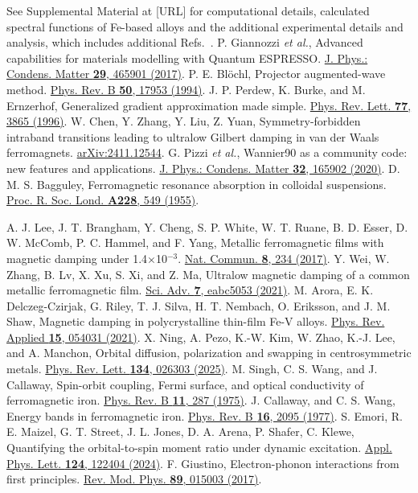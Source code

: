 \documentclass[prl,aps,twocolumn,showpacs,citeautoscript,reprint,superscriptaddress]{revtex4-1}
\newcommand{\DOI}[1]{\href{https://doi.org/#1}}
\begin{document}
\begin{thebibliography}{00}
See Supplemental Material at [URL] for computational details, calculated spectral functions of Fe-based alloys and the additional experimental details and analysis, which includes additional Refs.~\cite{Giannozzi:jpcm17,Blochl:prb94,Perdew:prl96,Chen:arxiv24,Pizzi:jpcm20,Bagguley:prsla55}.
P. Giannozzi {\it et al.}, Advanced capabilities for materials modelling with Quantum ESPRESSO. \DOI{10.1088/1361-648X/aa8f79}{J. Phys.: Condens. Matter {\bf 29}, 465901 (2017)}.
P. E. Bl{\"o}chl, Projector augmented-wave method. \DOI{10.1103/PhysRevB.50.17953}{Phys. Rev. B {\bf 50}, 17953 (1994)}.
J. P. Perdew, K. Burke, and M. Ernzerhof, Generalized gradient approximation made simple. \DOI{10.1103/PhysRevLett.77.3865}{Phys. Rev. Lett. {\bf 77}, 3865 (1996)}.
W. Chen, Y. Zhang, Y. Liu, Z. Yuan, Symmetry-forbidden intraband transitions leading to ultralow Gilbert damping in van der Waals ferromagnets. \href{https://arxiv.org/abs/2411.12544}{arXiv:2411.12544}.
G. Pizzi {\it et al.}, Wannier90 as a community code: new features and applications. \DOI{10.1088/1361-648X/ab51ff}{J. Phys.: Condens. Matter {\bf 32}, 165902 (2020)}.
D. M. S. Bagguley, Ferromagnetic resonance absorption in colloidal suspensions. \href{https://www.jstor.org/stable/99644}{Proc. R. Soc. Lond. {\bf A228}, 549 (1955)}.

A. J. Lee, J. T. Brangham, Y. Cheng, S. P. White, W. T. Ruane, B. D. Esser, D. W. McComb, P. C. Hammel, and F. Yang, Metallic ferromagnetic films with magnetic damping under 1.4$\times$10$^{-3}$. \DOI{10.1038/s41467-017-00332-x}{Nat. Commun. {\bf 8}, 234 (2017)}.
Y. Wei, W. Zhang, B. Lv, X. Xu, S. Xi, and Z. Ma, Ultralow magnetic damping of a common metallic ferromagnetic film. \DOI{10.1126/sciadv.abc5053}{Sci. Adv. {\bf 7}, eabc5053 (2021)}.
M. Arora, E. K. Delczeg-Czirjak, G. Riley, T. J. Silva, H. T. Nembach, O. Eriksson, and J. M. Shaw, Magnetic damping in polycrystalline thin-film Fe-V alloys. \DOI{10.1103/PhysRevApplied.15.054031}{Phys. Rev. Applied {\bf 15}, 054031 (2021)}.
X. Ning, A. Pezo, K.-W. Kim, W. Zhao, K.-J. Lee, and A. Manchon, Orbital diffusion, polarization and swapping in centrosymmetric metals. \DOI{10.1103/PhysRevLett.134.026303}{Phys. Rev. Lett. {\bf 134}, 026303 (2025)}.
M. Singh, C. S. Wang, and J. Callaway, Spin-orbit coupling, Fermi surface, and optical conductivity of ferromagnetic iron. \DOI{10.1103/PhysRevB.11.287}{Phys. Rev. B {\bf 11}, 287 (1975)}.
J. Callaway, and C. S. Wang, Energy bands in ferromagnetic iron. \DOI{10.1103/PhysRevB.16.2095}{Phys. Rev. B {\bf 16}, 2095 (1977)}.
S. Emori, R. E. Maizel, G. T. Street, J. L. Jones, D. A. Arena, P. Shafer, C. Klewe, Quantifying the orbital-to-spin moment ratio under dynamic excitation. \DOI{10.1063/5.0198326}{Appl. Phys. Lett. {\bf 124}, 122404 (2024)}.
F. Giustino, Electron-phonon interactions from first principles. \DOI{10.1103/RevModPhys.89.015003}{Rev. Mod. Phys. {\bf 89}, 015003 (2017)}.


\end{thebibliography}
\end{document}
